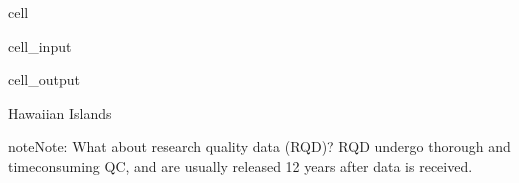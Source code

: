 \documentclass[letterpaper,10pt,english]{jupyterBook}
\begin{document}
\begin{sphinxuseclass}{cell}
\begin{sphinxVerbatimInput}
\begin{sphinxuseclass}{cell_input}
\end{sphinxuseclass}\end{sphinxVerbatimInput}
\begin{sphinxVerbatimOutput}

\begin{sphinxuseclass}{cell_output}
\begin{sphinxVerbatim}[commandchars=\\\{\}]
\PYGZsq{}Hawaiian Islands\PYGZsq{}
\end{sphinxVerbatim}

\end{sphinxuseclass}\end{sphinxVerbatimOutput}

\end{sphinxuseclass}
\begin{sphinxShadowBox}
\sphinxstylesidebartitle{}

\begin{sphinxadmonition}{note}{Note:}
\sphinxAtStartPar
What about research quality data (RQD)?
RQD undergo thorough and time\sphinxhyphen{}consuming QC, and are usually released 1\sphinxhyphen{}2 years after data is received.
\end{sphinxadmonition}
\end{sphinxShadowBox}
\end{document}
